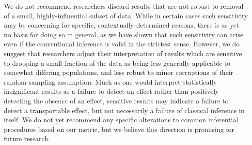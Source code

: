 We do not recommend researchers discard results that are not robust to removal
of a small, highly-influential subset of data. While in certain cases such
sensitivity may be concerning for specific, contextually-determined reasons,
there is as yet no basis for doing so in general, as we have shown that such
sensitivity can arise even if the conventional inference is valid in the
strictest sense. However, we do suggest that researchers adjust their
interpretation of results which are sensitive to dropping a small fraction of
the data as being less generally applicable to somewhat differing populations,
and less robust to minor corruptions of their random sampling assumption. Much
as one would interpret statistically insignificant results as a failure to
detect an effect rather than positively detecting the absence of an effect,
sensitive results may indicate a failure to detect a transportable effect, but
not necessarily a failure of classical inference in itself. We do not yet
recommend any specific alterations to common inferential procedures based on our
metric, but we believe this direction is promising for future research.
